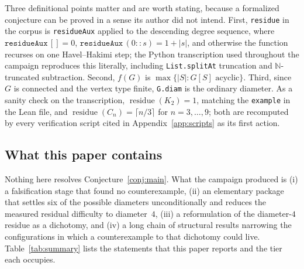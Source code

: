 \documentclass[11pt]{article}
\theoremstyle{plain}
\theoremstyle{definition}
\theoremstyle{remark}
\numberwithin{equation}{section}
\newcommand{\N}{\mathbb{N}}
\DeclareMathOperator{\res}{residue}
\begin{document}
Three definitional points matter and are worth stating, because a formalized conjecture can
be proved in a sense its author did not intend. First, \texttt{residue} in the corpus is
\texttt{residueAux} applied to the descending degree sequence, where
$\texttt{residueAux}\,[] = 0$, $\texttt{residueAux}\,(0 :: s) = 1 + |s|$, and otherwise the
function recurses on one Havel--Hakimi step; the Python transcription used throughout the
campaign reproduces this literally, including \texttt{List.splitAt} truncation and
$\N$-truncated subtraction. Second, $f(G)$ is
$\max\{|S| : G[S] \text{ acyclic}\}$. Third, since $G$ is connected and the vertex type
finite, \texttt{G.diam} is the ordinary diameter. As a sanity check on the transcription,
$\res(K_2) = 1$, matching the \texttt{example} in the Lean file, and
$\res(C_n) = \lceil n/3 \rceil$ for $n = 3,\dots,9$; both are recomputed by every
verification script cited in Appendix~\ref{app:scripts} as its first action.

\subsection{What this paper contains}\label{sec:contains}

Nothing here resolves Conjecture~\ref{conj:main}. What the campaign produced is
(i) a falsification stage that found no counterexample, (ii) an elementary package that
settles six of the possible diameters unconditionally and reduces the measured residual
difficulty to diameter~$4$, (iii) a reformulation of the diameter-$4$ residue as a
dichotomy, and (iv) a long chain of structural results narrowing the configurations in
which a counterexample to that dichotomy could live. Table~\ref{tab:summary} lists the
statements that this paper reports and the tier each occupies.
\end{document}
